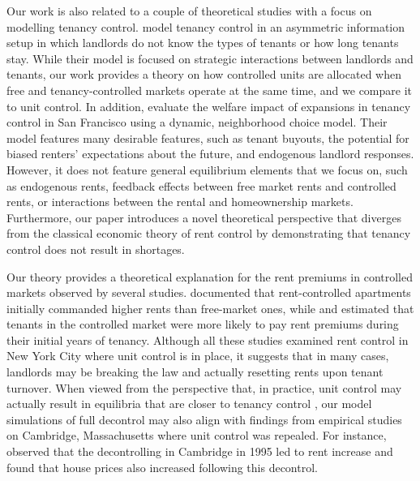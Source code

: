 \documentclass[parskip=full]{article}
\begin{document}

Our work is also related to a couple of theoretical studies with a focus on modelling tenancy control. \citet{be-2000} model tenancy control in an asymmetric information setup in which landlords do not know the types of tenants or how long tenants stay. While their model is focused on strategic interactions between landlords and tenants, our work provides a theory on how controlled units are allocated when free and tenancy-controlled markets operate at the same time, and we compare it to unit control. In addition, \citet{diamond-2019} evaluate the welfare impact of expansions in tenancy control in San Francisco using a dynamic, neighborhood choice model. Their model features many desirable features, such as tenant buyouts, the potential for biased renters' expectations about the future, and endogenous landlord responses. However, it does not feature general equilibrium elements that we focus on, such as endogenous rents, feedback effects between free market rents and controlled rents, or interactions between the rental and homeownership markets. Furthermore, our paper introduces a novel theoretical perspective that diverges from the classical economic theory of rent control by demonstrating that tenancy control does not result in shortages.

Our theory provides a theoretical explanation for the rent premiums in controlled markets observed by several studies. \citet{nagy-1997} documented that rent-controlled apartments initially commanded higher rents than free-market ones, while \citet{early-2000} and \citet{cjq-2023} estimated that tenants in the controlled market were more likely to pay rent premiums during their initial years of tenancy. Although all these studies examined rent control in New York City where unit control is in place, it suggests that in many cases, landlords may be breaking the law and actually resetting rents upon tenant turnover. When viewed from the perspective that, in practice, unit control may actually result in equilibria that are closer to tenancy control \citep{be-2000}, our model simulations of full decontrol may also align with findings from empirical studies on Cambridge, Massachusetts where unit control was repealed. For instance, \citet{sims-2007} observed that the decontrolling in Cambridge in 1995 led to rent increase and \citet{app-2014} found that house prices also increased following this decontrol. 
\end{document}
